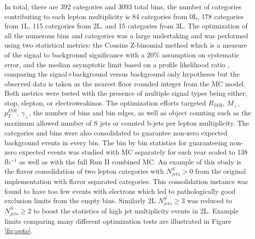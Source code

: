 In total, there are 392 categories and 3093 total bins, the number of categories contributing to each lepton multiplicity is 84 categories from 0L, 178 categories from 1L, 115 categories from 2L, and 15 categories from 3L. The optimization of all the numerous bins and categories was a large undertaking and was performed using two statistical metrics: the Cousins Z-binomial method \cite{Cousins_2008} which is a measure of the signal to background significance with a $20\%$ assumption on systematic error, and the median asymptotic limit based on a profile likelihood ratio \cite{Cowan:2010js}, comparing the signal+background versus background only hypotheses but the observed data is taken as the nearest floor rounded integer from the MC model. Both metrics were tested with the presence of multiple signal types being either, stop, slepton, or electroweakinos. The optimization efforts targeted $R_{ISR}$, $M_\perp$, $p_T^{ISR}$, $\gamma_\perp$, the number of bins and bin edges, as well as object counting such as the  maximum allowed number of S jets or counted b-jets per lepton multiplicity. The categories and bins were also consolidated to guarantee non-zero expected background events in every bin. The bin by bin statistics for guaranteeing non-zero expected events was studied with MC separately for each year scaled to 138 fb$^{-1}$ as well as with the full Run II combined MC. An example of this study is the flavor consolidation of two lepton categories with $N_{jets}^S > 0$ from the original implementation with flavor separated categories. This consolidation instance was found to have too few events with electrons which led to pathologically good exclusion limits from the empty bins. Similarly 2L $N_{jets}^S \geq 3$  was reduced to $N_{jets}^S \geq 2$ to boost the statistics of high jet multiplicity events in 2L. Example limits comparing many different optimization tests are illustrated in Figure \ref{fig:opto}.

